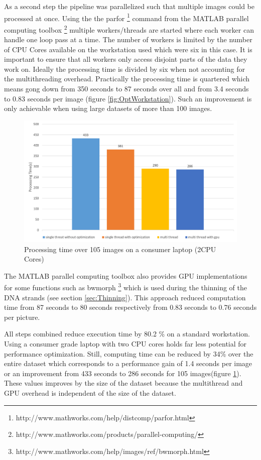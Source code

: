 \documentclass{article}
\begin{document}
As a second step the pipeline was parallelized such that multiple images could be processed at once.
Using the the parfor  \footnote{http://www.mathworks.com/help/distcomp/parfor.html}  command from the MATLAB parallel computing toolbox \footnote{http://www.mathworks.com/products/parallel-computing/} multiple workers/threads are started where each worker can handle one loop pass at a time.
The number of workers is limited by the number of CPU Cores available on the workstation used which were six in this case.
It is important to ensure that all workers only access disjoint parts of the data they work on.
Ideally the processing time is divided by six when not accounting for the multithreading overhead. Practically the processing time is quartered which means gong down from 350 seconds to 87 seconds over all 
and from 3.4 seconds to 0.83 seconds per image (figure \ref{fig:OptWorkstation}).
Such an improvement is only achievable when using large datasets of more than 100 images.
\begin{figure}[!ht]
	
	\includegraphics[width=1\linewidth]{OptLaptop.png}
	
	\caption{Processing time over 105 images on a consumer laptop (2CPU Cores)} %
	\label{fig:OptLaptop} 
\end{figure}

The MATLAB parallel computing toolbox also provides GPU implementations for some functions such as bwmorph \footnote{http://www.mathworks.com/help/images/ref/bwmorph.html}
which is used during the thinning of the DNA strands (see section \ref{sec:Thinning}).
This approach reduced computation time from 87 seconds to 80 seconds respectively from 0.83 seconds to 0.76 seconds per picture.

All steps combined reduce execution time by 80.2 \% on a standard workstation.
Using a consumer grade laptop with two CPU cores holds far less potential for performance optimization.
Still, computing time can be reduced by 34\% over the entire dataset which corresponds to a performance gain of 1.4 seconds per image or an improvement from 433 seconds to 286 seconds for 105 images(figure \ref{fig:OptLaptop}).
These values improves by the size of the dataset because the multithread and GPU overhead is independent of the size of the dataset.
\end{document}

